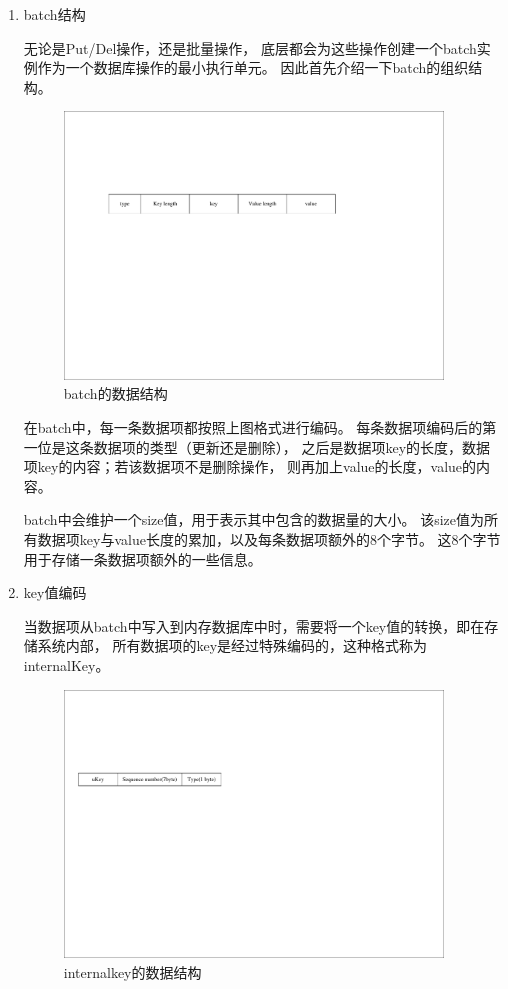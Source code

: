 \begin{enumerate}
		\item batch结构
		
		无论是Put/Del操作，还是批量操作，
		底层都会为这些操作创建一个batch实例作为一个数据库操作的最小执行单元。
		因此首先介绍一下batch的组织结构。

		\begin{figure}[H]
			\centering
			\includegraphics[width=0.95\textwidth]{pdf/batch.pdf}
			\caption{batch的数据结构}
			\label{batch}
		\end{figure}

		在batch中，每一条数据项都按照上图格式进行编码。
		每条数据项编码后的第一位是这条数据项的类型（更新还是删除），
		之后是数据项key的长度，数据项key的内容；若该数据项不是删除操作，
		则再加上value的长度，value的内容。

		batch中会维护一个size值，用于表示其中包含的数据量的大小。
		该size值为所有数据项key与value长度的累加，以及每条数据项额外的8个字节。
		这8个字节用于存储一条数据项额外的一些信息。
		

		\item key值编码
		
		当数据项从batch中写入到内存数据库中时，需要将一个key值的转换，即在存储系统内部，
		所有数据项的key是经过特殊编码的，这种格式称为internalKey。

		\begin{figure}[H]
			\centering
			\includegraphics[width=0.95\textwidth]{pdf/internalkey.pdf}
			\caption{internalkey的数据结构}
			\label{internalkey}
		\end{figure}



\end{enumerate}
